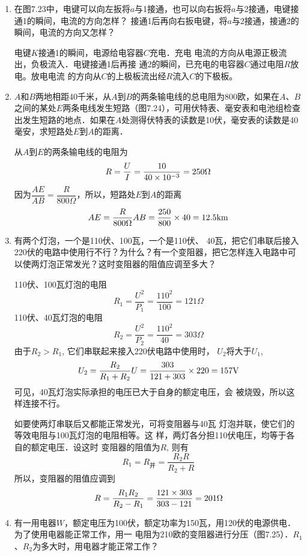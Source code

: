 \begin{enumerate}
    \item 在图7.23中，电键可以向左扳将$a$与1接通，也可以向右扳将$a$与2接通，电键接通1的瞬间，电流的方向怎样？
接通1后再向右扳电键，将$a$与2接通，接通2的瞬间，电流的方向又怎样？

\begin{solution}
    电键$K$接通1的瞬间，电源给电容器$C$充电．充电
    电流的方向从电源正极流出，负极流入．电键接通1后再接
    通2的瞬间，已充电的电容器$C$通过电阻$R$放电。放电电流
    的方向从$C$的上极板流出经$R$流入$C$的下极板。
\end{solution}

\item $A$和$B$两地相距40千米，从$A$到$B$的两条输电线的总电阻为800欧，如果在$A$、$B$之间的某处$E$两条电线发生短路（图7.24），可用伏特表、毫安表和电池组检查出发生短路的地点．如果在$A$处测得伏特表的读数是10伏，毫安表的读数是40毫安，求短路处$E$到$A$的距离．

\begin{solution}
    从$A$到$E$的两条输电线的电阻为
\[R=\frac{U}{I}=\frac{10}{40\times 10^{-3}}=250\Omega\]
因为$\dfrac{AE}{AB}=\dfrac{R}{800\Omega}$，所以，短路处$E$到$A$的距离
\[AE=\frac{R}{800\Omega}AB=\frac{250}{800}\times 40=12.5{\rm km}\]
\end{solution}

\item 有两个灯泡，一个是110伏、100瓦，一个是110伏、
40瓦，把它们串联后接入220伏的电路中使用行不行？为什么？有一个变阻器，把它怎样连入电路中可以使两灯泡正常发光？这时变阻器的阻值应调至多大？

\begin{solution}
110伏、100瓦灯泡的电阻
\[R_1=\frac{U^2}{P_1}=\frac{110^2}{100}=121\Omega\]
110伏、40瓦灯泡的电阻
\[R_2=\frac{U^2}{P_2}=\frac{110^2}{40}=303\Omega\]
由于$R_2>R_1$, 它们串联起来接入220伏电路中使用时，
$U_2$将大于$U_1$, 
\[U_2=\frac{R_2}{R_1+R_2}U=\frac{303}{121+303}\times 220=157{\rm V}\]
可见，40瓦灯泡实际承担的电压已大于自身的额定电压，会
被烧毁，所以这样连接不行。

如要使两灯串联后又都能正常发光，可将变阻器与40瓦
灯泡并联，使它们的等效电阻与100瓦灯泡的电阻相等。这
样，两灯各分担110伏电压，均等于各自的额定电压．设这时
变阻器的阻值为$R$, 则有
\[R_1=R_{\text{并}}=\frac{R_2R}{R_2+R}\]
所以，变阻器的阻值应调到
\[R=\frac{R_1R_2}{R_2-R_1}=\frac{121\times 303}{303-121}=201\Omega\]
\end{solution}

\item 有一用电器$W$，额定电压为100伏，额定功率为150瓦，用120伏的电源供电．为了使用电器能正常工作，用一
电阻为210欧的变阻器进行分压（图7.25）．$R_1$、$R_2$为多大时，用电器才能正常工作？


\end{enumerate}
